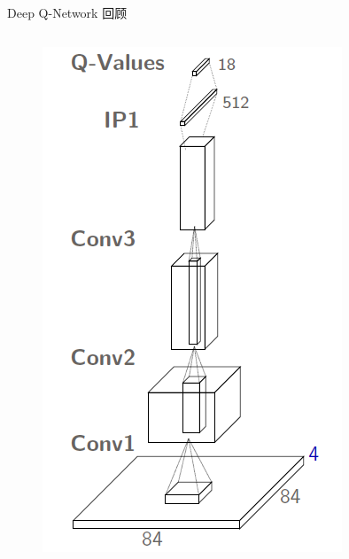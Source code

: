 \documentclass[10pt]{beamer}
\begin{document}
\begin{frame}{Deep Q-Network 回顾}
\begin{columns}
\begin{column}{.4\linewidth}
\begin{figure}
					\includegraphics[width=0.9\linewidth]{pictures/dqn-architecture-2}
				\end{figure}
				
			\end{column}
		\end{columns}
		
	\end{frame}
\end{document}
